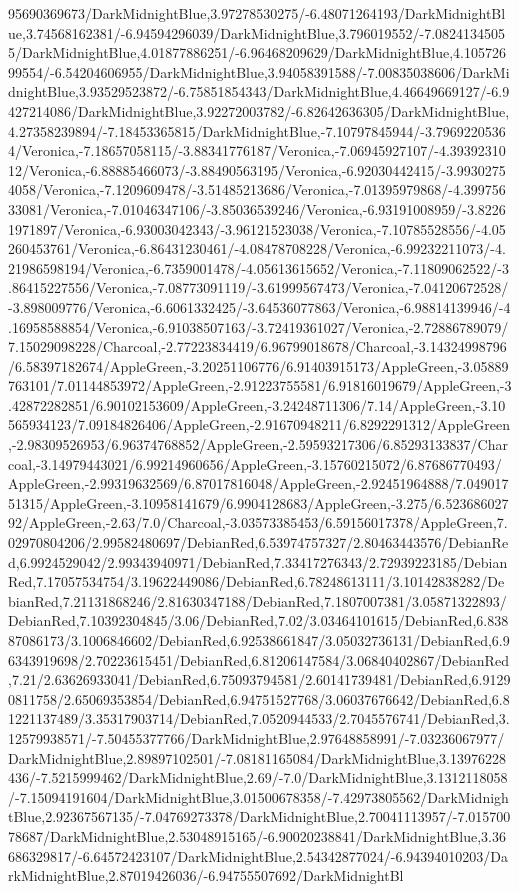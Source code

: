 {\begin{tikzternal}
95690369673/DarkMidnightBlue,3.97278530275/-6.48071264193/DarkMidnightBlue,3.74568162381/-6.94594296039/DarkMidnightBlue,3.796019552/-7.08241345055/DarkMidnightBlue,4.01877886251/-6.96468209629/DarkMidnightBlue,4.10572699554/-6.54204606955/DarkMidnightBlue,3.94058391588/-7.00835038606/DarkMidnightBlue,3.93529523872/-6.75851854343/DarkMidnightBlue,4.46649669127/-6.9427214086/DarkMidnightBlue,3.92272003782/-6.82642636305/DarkMidnightBlue,4.27358239894/-7.18453365815/DarkMidnightBlue,-7.10797845944/-3.79692205364/Veronica,-7.18657058115/-3.88341776187/Veronica,-7.06945927107/-4.3939231012/Veronica,-6.88885466073/-3.88490563195/Veronica,-6.92030442415/-3.99302754058/Veronica,-7.1209609478/-3.51485213686/Veronica,-7.01395979868/-4.39975633081/Veronica,-7.01046347106/-3.85036539246/Veronica,-6.93191008959/-3.82261971897/Veronica,-6.93003042343/-3.96121523038/Veronica,-7.10785528556/-4.05260453761/Veronica,-6.86431230461/-4.08478708228/Veronica,-6.99232211073/-4.21986598194/Veronica,-6.7359001478/-4.05613615652/Veronica,-7.11809062522/-3.86415227556/Veronica,-7.08773091119/-3.61999567473/Veronica,-7.04120672528/-3.898009776/Veronica,-6.6061332425/-3.64536077863/Veronica,-6.98814139946/-4.16958588854/Veronica,-6.91038507163/-3.72419361027/Veronica,-2.72886789079/7.15029098228/Charcoal,-2.77223834419/6.96799018678/Charcoal,-3.14324998796/6.58397182674/AppleGreen,-3.20251106776/6.91403915173/AppleGreen,-3.05889763101/7.01144853972/AppleGreen,-2.91223755581/6.91816019679/AppleGreen,-3.42872282851/6.90102153609/AppleGreen,-3.24248711306/7.14/AppleGreen,-3.10565934123/7.09184826406/AppleGreen,-2.91670948211/6.8292291312/AppleGreen,-2.98309526953/6.96374768852/AppleGreen,-2.59593217306/6.85293133837/Charcoal,-3.14979443021/6.99214960656/AppleGreen,-3.15760215072/6.87686770493/AppleGreen,-2.99319632569/6.87017816048/AppleGreen,-2.92451964888/7.04901751315/AppleGreen,-3.10958141679/6.9904128683/AppleGreen,-3.275/6.52368602792/AppleGreen,-2.63/7.0/Charcoal,-3.03573385453/6.59156017378/AppleGreen,7.02970804206/2.99582480697/DebianRed,6.53974757327/2.80463443576/DebianRed,6.9924529042/2.99343940971/DebianRed,7.33417276343/2.72939223185/DebianRed,7.17057534754/3.19622449086/DebianRed,6.78248613111/3.10142838282/DebianRed,7.21131868246/2.81630347188/DebianRed,7.1807007381/3.05871322893/DebianRed,7.10392304845/3.06/DebianRed,7.02/3.03464101615/DebianRed,6.83887086173/3.1006846602/DebianRed,6.92538661847/3.05032736131/DebianRed,6.96343919698/2.70223615451/DebianRed,6.81206147584/3.06840402867/DebianRed,7.21/2.63626933041/DebianRed,6.75093794581/2.60141739481/DebianRed,6.91290811758/2.65069353854/DebianRed,6.94751527768/3.06037676642/DebianRed,6.81221137489/3.35317903714/DebianRed,7.0520944533/2.7045576741/DebianRed,3.12579938571/-7.50455377766/DarkMidnightBlue,2.97648858991/-7.03236067977/DarkMidnightBlue,2.89897102501/-7.08181165084/DarkMidnightBlue,3.13976228436/-7.5215999462/DarkMidnightBlue,2.69/-7.0/DarkMidnightBlue,3.1312118058/-7.15094191604/DarkMidnightBlue,3.01500678358/-7.42973805562/DarkMidnightBlue,2.92367567135/-7.04769273378/DarkMidnightBlue,2.70041113957/-7.01570078687/DarkMidnightBlue,2.53048915165/-6.90020238841/DarkMidnightBlue,3.36686329817/-6.64572423107/DarkMidnightBlue,2.54342877024/-6.94394010203/DarkMidnightBlue,2.87019426036/-6.94755507692/DarkMidnightBl
\end{tikzternal}}
